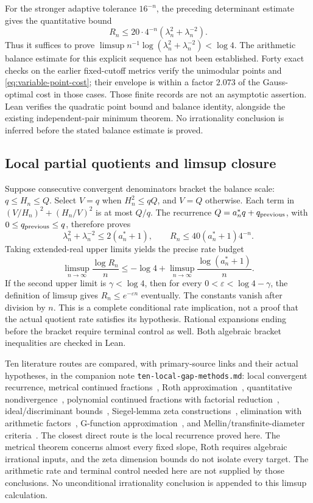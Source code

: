 \documentclass[11pt]{article}
\theoremstyle{remark}
\begin{document}
For the stronger adaptive tolerance \(16^{-n}\), the preceding
determinant estimate gives the quantitative bound
\[
 R_n\le20\cdot4^{-n}(\lambda_n^2+\lambda_n^{-2}).
\]
Thus it suffices to prove
\(\limsup n^{-1}\log(\lambda_n^2+\lambda_n^{-2})<\log4\).
The arithmetic balance estimate for this explicit sequence has not
been established. Forty exact checks on the earlier fixed-cutoff
metrics verify the unimodular points and \eqref{eq:variable-point-cost};
their envelope is within a factor \(2.073\) of the Gauss-optimal cost
in those cases. Those finite records are not an asymptotic assertion.
Lean verifies the quadratic point bound and balance identity, alongside
the existing independent-pair minimum theorem. No irrationality
conclusion is inferred before the stated balance estimate is proved.

\subsection{Local partial quotients and limsup closure}
Suppose consecutive convergent denominators bracket the balance scale:
\(q\le H_n\le Q\). Select \(V=q\) when \(H_n^2\le qQ\), and
\(V=Q\) otherwise. Each term in
\((V/H_n)^2+(H_n/V)^2\) is at most \(Q/q\). The recurrence
\(Q=a_n^*q+q_{\rm previous}\), with \(0\le q_{\rm previous}\le q\),
therefore proves
\[
 \lambda_n^2+\lambda_n^{-2}\le2(a_n^*+1),\qquad
 R_n\le40(a_n^*+1)4^{-n}.
\]
Taking extended-real upper limits yields the precise rate budget
\[
 \limsup_{n\to\infty}\frac{\log R_n}{n}
 \le-\log4+
       \limsup_{n\to\infty}\frac{\log(a_n^*+1)}n.
\]
If the second upper limit is \(\gamma<\log4\), then for every
\(0<\varepsilon<\log4-\gamma\), the definition of limsup gives
\(R_n\le e^{-\varepsilon n}\) eventually. The constants vanish after
division by \(n\). This is a complete conditional rate implication,
not a proof that the actual quotient rate satisfies its hypothesis.
Rational expansions ending before the bracket require terminal control
as well. Both algebraic bracket inequalities are checked in Lean.

Ten literature routes are compared, with primary-source links and their
actual hypotheses, in the companion note
\texttt{ten-local-gap-methods.md}: local convergent recurrence,
metrical continued fractions~\cite{levy-original}, Roth approximation~\cite{roth-original}, quantitative
nondivergence~\cite{nondiv-source}, polynomial continued fractions with factorial reduction~\cite{pcf-source},
ideal/discriminant bounds~\cite{odlyzko-source}, Siegel-lemma zeta constructions~\cite{fischler-source},
elimination with arithmetic factors~\cite{lai-source}, G-function approximation~\cite{gfunction-source}, and
Mellin/transfinite-diameter criteria~\cite{brown-source}. The closest direct route is the
local recurrence proved here. The metrical theorem concerns almost
every fixed slope, Roth requires algebraic irrational inputs, and the
zeta dimension bounds do not isolate every target. The arithmetic
rate and terminal control needed here are not supplied by those
conclusions. No unconditional irrationality conclusion is appended
to this limsup calculation.
\end{document}
